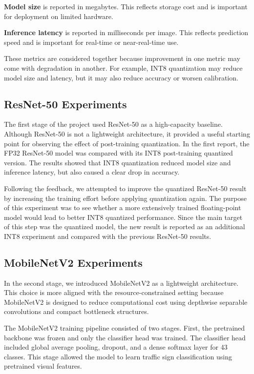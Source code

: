 \documentclass{article} %
\begin{document}
\textbf{Model size} is reported in megabytes. This reflects storage cost and is important for deployment on limited hardware.

\textbf{Inference latency} is reported in milliseconds per image. This reflects prediction speed and is important for real-time or near-real-time use.

These metrics are considered together because improvement in one metric may come with degradation in another. For example, INT8 quantization may reduce model size and latency, but it may also reduce accuracy or worsen calibration.

\subsection{ResNet-50 Experiments}

The first stage of the project used ResNet-50 as a high-capacity baseline. Although ResNet-50 is not a lightweight architecture, it provided a useful starting point for observing the effect of post-training quantization. In the first report, the FP32 ResNet-50 model was compared with its INT8 post-training quantized version. The results showed that INT8 quantization reduced model size and inference latency, but also caused a clear drop in accuracy.

Following the feedback, we attempted to improve the quantized ResNet-50 result by increasing the training effort before applying quantization again. The purpose of this experiment was to see whether a more extensively trained floating-point model would lead to better INT8 quantized performance. Since the main target of this step was the quantized model, the new result is reported as an additional INT8 experiment and compared with the previous ResNet-50 results.

\subsection{MobileNetV2 Experiments}

In the second stage, we introduced MobileNetV2 as a lightweight architecture. This choice is more aligned with the resource-constrained setting because MobileNetV2 is designed to reduce computational cost using depthwise separable convolutions and compact bottleneck structures.

The MobileNetV2 training pipeline consisted of two stages. First, the pretrained backbone was frozen and only the classifier head was trained. The classifier head included global average pooling, dropout, and a dense softmax layer for 43 classes. This stage allowed the model to learn traffic sign classification using pretrained visual features.
\end{document}
